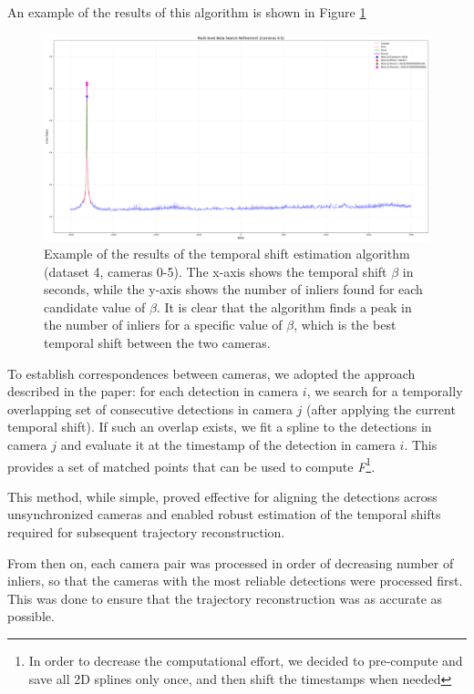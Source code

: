 \documentclass[11pt]{article}
\begin{document}
An example of the results of this algorithm is shown in Figure \ref{fig:beta_search}

\begin{figure}[h]
    \centering
    \includegraphics[width=\textwidth]{../plots/search_results/dataset4/inliers_vs_beta_combined_cam0-5_ds4.png}
    \caption{Example of the results of the temporal shift estimation algorithm (dataset 4, cameras 0-5). The x-axis shows the temporal shift $\beta$ in seconds, while the y-axis shows the number of inliers found for each candidate value of $\beta$. It is clear that the algorithm finds a peak in the number of inliers for a specific value of $\beta$, which is the best temporal shift between the two cameras.}
    \label{fig:beta_search}
\end{figure}

To establish correspondences between cameras, we adopted the approach described in the paper: for each detection in camera $i$, we search for a temporally overlapping set of consecutive detections in camera $j$ (after applying the current temporal shift). If such an overlap exists, we fit a spline to the detections in camera $j$ and evaluate it at the timestamp of the detection in camera $i$. This provides a set of matched points that can be used to compute \textit{F}\footnote{In order to decrease the computational effort, we decided to pre-compute and save all 2D splines only once, and then shift the timestamps when needed}.

This method, while simple, proved effective for aligning the detections across unsynchronized cameras and enabled robust estimation of the temporal shifts required for subsequent trajectory reconstruction.

From then on, each camera pair was processed in order of decreasing number of inliers, so that the cameras with the most reliable detections were processed first. This was done to ensure that the trajectory reconstruction was as accurate as possible.
\end{document}
